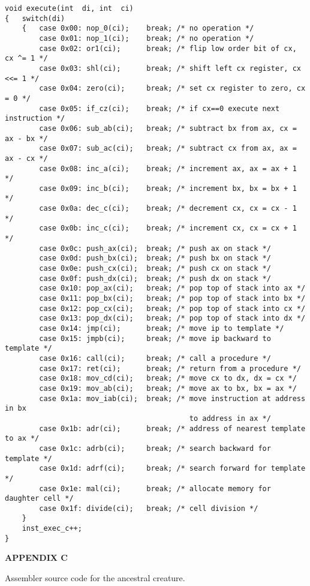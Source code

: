 \begin{verbatim}
void execute(int  di, int  ci)
{   switch(di)
    {   case 0x00: nop_0(ci);    break; /* no operation */
        case 0x01: nop_1(ci);    break; /* no operation */
        case 0x02: or1(ci);      break; /* flip low order bit of cx, cx ^= 1 */
        case 0x03: shl(ci);      break; /* shift left cx register, cx <<= 1 */
        case 0x04: zero(ci);     break; /* set cx register to zero, cx = 0 */
        case 0x05: if_cz(ci);    break; /* if cx==0 execute next instruction */
        case 0x06: sub_ab(ci);   break; /* subtract bx from ax, cx = ax - bx */
        case 0x07: sub_ac(ci);   break; /* subtract cx from ax, ax = ax - cx */
        case 0x08: inc_a(ci);    break; /* increment ax, ax = ax + 1 */
        case 0x09: inc_b(ci);    break; /* increment bx, bx = bx + 1 */
        case 0x0a: dec_c(ci);    break; /* decrement cx, cx = cx - 1 */
        case 0x0b: inc_c(ci);    break; /* increment cx, cx = cx + 1 */
        case 0x0c: push_ax(ci);  break; /* push ax on stack */
        case 0x0d: push_bx(ci);  break; /* push bx on stack */
        case 0x0e: push_cx(ci);  break; /* push cx on stack */
        case 0x0f: push_dx(ci);  break; /* push dx on stack */
        case 0x10: pop_ax(ci);   break; /* pop top of stack into ax */
        case 0x11: pop_bx(ci);   break; /* pop top of stack into bx */
        case 0x12: pop_cx(ci);   break; /* pop top of stack into cx */
        case 0x13: pop_dx(ci);   break; /* pop top of stack into dx */
        case 0x14: jmp(ci);      break; /* move ip to template */
        case 0x15: jmpb(ci);     break; /* move ip backward to template */
        case 0x16: call(ci);     break; /* call a procedure */
        case 0x17: ret(ci);      break; /* return from a procedure */
        case 0x18: mov_cd(ci);   break; /* move cx to dx, dx = cx */
        case 0x19: mov_ab(ci);   break; /* move ax to bx, bx = ax */
        case 0x1a: mov_iab(ci);  break; /* move instruction at address in bx
                                           to address in ax */
        case 0x1b: adr(ci);      break; /* address of nearest template to ax */
        case 0x1c: adrb(ci);     break; /* search backward for template */
        case 0x1d: adrf(ci);     break; /* search forward for template */
        case 0x1e: mal(ci);      break; /* allocate memory for daughter cell */
        case 0x1f: divide(ci);   break; /* cell division */
    }
    inst_exec_c++;
}
\end{verbatim}
\newpage
\LP
\bf APPENDIX C\rm
\eLP

Assembler source code for the ancestral creature.

